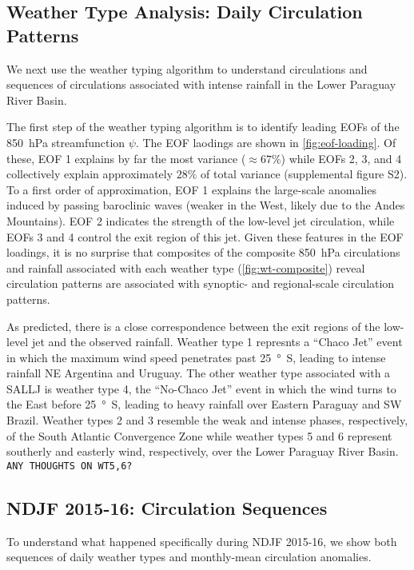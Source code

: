 \documentclass[twocol]{ametsoc}
\begin{document}
\subsection{Weather Type Analysis: Daily Circulation Patterns} \label{sec:weather-types}

We next use the weather typing algorithm to understand circulations and sequences of circulations associated with intense rainfall in the Lower Paraguay River Basin.

The first step of the weather typing algorithm is to identify leading EOFs of the \SI{850}{\hecto\pascal} streamfunction $\psi$.
The EOF laodings are shown in \cref{fig:eof-loading}.
Of these, EOF 1 explains by far the most variance ($\approx 67\%$) while EOFs 2, 3, and 4 collectively explain approximately $28\%$ of total variance (supplemental figure S2).
To a first order of approximation, EOF 1 explains the large-scale anomalies induced by passing baroclinic waves (weaker in the West, likely due to the Andes Mountains).
EOF 2 indicates the strength of the low-level jet circulation, while EOFs 3 and 4 control the exit region of this jet.
Given these features in the EOF loadings, it is no surprise that composites of the composite \SI{850}{\hecto\pascal} circulations and rainfall associated with each weather type (\cref{fig:wt-composite}) reveal circulation patterns are associated with synoptic- and regional-scale circulation patterns.

As predicted, there is a close correspondence between the exit regions of the low-level jet and the observed rainfall.
Weather type 1 represnts a ``Chaco Jet'' event \citep{Salio:2002ev} in which the maximum wind speed penetrates past \SI{25}{\degree S}, leading to intense rainfall NE Argentina and Uruguay.
The other weather type associated with a SALLJ is weather type 4, the ``No-Chaco Jet'' event in which the wind turns to the East before \SI{25}{\degree S}, leading to heavy rainfall over Eastern Paraguay and SW Brazil.
Weather types 2 and 3 resemble the weak and intense phases, respectively, of the South Atlantic Convergence Zone \citep[SACZ;][]{Carvalho2004} while weather types 5 and 6 represent southerly and easterly wind, respectively, over the Lower Paraguay River Basin.
\texttt{ANY THOUGHTS ON WT5,6?}

\subsection{NDJF 2015-16: Circulation Sequences}

To understand what happened specifically during NDJF 2015-16, we show both sequences of daily weather types and monthly-mean circulation anomalies.
\end{document}

